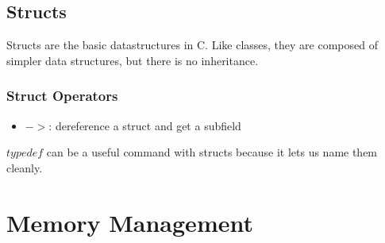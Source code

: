 \documentclass{article}
\begin{document}
\subsection{Structs}
Structs are the basic datastructures in C. Like classes, they are composed of simpler data structures,
but there is no inheritance.
\subsubsection{Struct Operators}
\begin{itemize}
    \item $->$: dereference a struct and get a subfield
\end{itemize}
$typedef$ can be a useful command with structs because it lets us name them cleanly.
\section{Memory Management}
\end{document}

